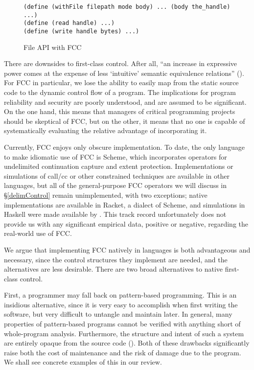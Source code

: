 \documentclass[11pt]{article}
\begin{document}
\begin{figure}[H]
\caption{File API with FCC}
\label{fig:fileAPIFCC}
\begin{verbatim}
(define (withFile filepath mode body) ... (body the_handle) ...)
(define (read handle) ...)
(define (write handle bytes) ...)
\end{verbatim}
\end{figure}

There are downsides to first-class control. After all, ``an increase in expressive power comes at the expense of less `intuitive' semantic equivalence relations'' (\cite{Felleisen90expressive}).
For FCC in particular, we lose the ability to easily map from the static source code to the dynamic control flow of a program.
The implications for program reliability and security are poorly understood, and are assumed to be significant.
On the one hand, this means that managers of critical programming projects should be skeptical of FCC, but on the other, it means that no one is capable of systematically evaluating the relative advantage of incorporating it.

Currently, FCC enjoys only obscure implementation.
To date, the only language to make idiomatic use of FCC is Scheme, which incorporates operators for undelimited continuation capture and extent protection.
Implementations or simulations of call/cc or other constrained techniques are available in other languages, but all of the general-purpose FCC operators we will discuss in \S\ref{delimControl} remain unimplemented, with two exceptions;
native implementations are available in Racket, a dialect of Scheme, and simulations in Haskell were made available by \cite{MFDC}.
This track record unfortunately does not provide us with any significant empirical data, positive or negative, regarding the real-world use of FCC.

We argue that implementing FCC natively in languages is both advantageous and necessary, since the control structures they implement are needed, and the alternatives are less desirable.
There are two broad alternatives to native first-class control.

First, a programmer may fall back on pattern-based programming.
This is an insidious alternative, since it is very easy to accomplish when first writing the software, but very difficult to untangle and maintain later.
In general, many properties of pattern-based programs cannot be verified with anything short of whole-program analysis.
Furthermore, the structure and intent of such a system are entirely opaque from the source code (\cite{Felleisen90expressive}).
Both of these drawbacks significantly raise both the cost of maintenance and the risk of damage due to the program.
We shall see concrete examples of this in our review.
\end{document}
